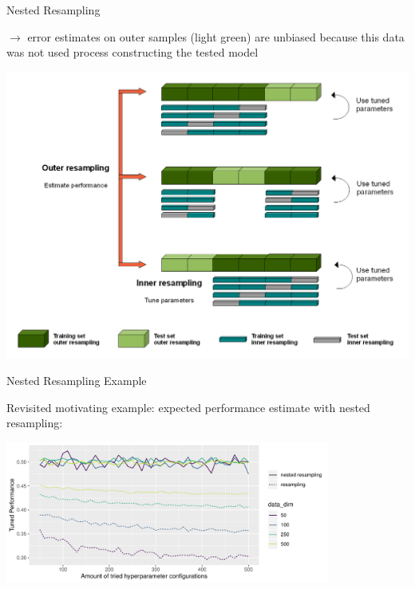 \begin{frame}[c,allowframebreaks]{Nested Resampling}
    \framebreak

    \begin{footnotesize}
    $\rightarrow$ error estimates on outer samples (light green) are unbiased
    because this data was not used process constructing the tested model
    \end{footnotesize}

    \begin{center}
        \includegraphics[height=0.6\textheight]{Nested_Resampling.png}
    \end{center}

    \end{frame}


    \begin{frame}[c]{Nested Resampling Example}

    Revisited motivating example: expected performance estimate with nested
    resampling:

    \begin{center}
        \includegraphics[width=0.8\textwidth]{nested-resampling-example}
    \end{center}


    \end{frame}


